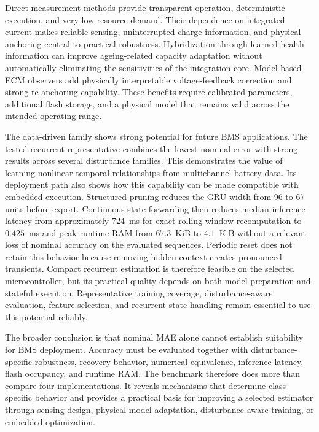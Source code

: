 Direct-measurement methods provide transparent operation, deterministic execution, and very low resource demand. Their dependence on integrated current makes reliable sensing, uninterrupted charge information, and physical anchoring central to practical robustness. Hybridization through learned health information can improve ageing-related capacity adaptation without automatically eliminating the sensitivities of the integration core. Model-based ECM observers add physically interpretable voltage-feedback correction and strong re-anchoring capability. These benefits require calibrated parameters, additional flash storage, and a physical model that remains valid across the intended operating range.

The data-driven family shows strong potential for future BMS applications. The tested recurrent representative combines the lowest nominal error with strong results across several disturbance families. This demonstrates the value of learning nonlinear temporal relationships from multichannel battery data. Its deployment path also shows how this capability can be made compatible with embedded execution. Structured pruning reduces the GRU width from 96 to 67 units before export. Continuous-state forwarding then reduces median inference latency from approximately $724$~ms for exact rolling-window recomputation to $0.425$~ms and peak runtime RAM from $67.3$~KiB to $4.1$~KiB without a relevant loss of nominal accuracy on the evaluated sequences. Periodic reset does not retain this behavior because removing hidden context creates pronounced transients. Compact recurrent estimation is therefore feasible on the selected microcontroller, but its practical quality depends on both model preparation and stateful execution. Representative training coverage, disturbance-aware evaluation, feature selection, and recurrent-state handling remain essential to use this potential reliably.

The broader conclusion is that nominal MAE alone cannot establish suitability for BMS deployment. Accuracy must be evaluated together with disturbance-specific robustness, recovery behavior, numerical equivalence, inference latency, flash occupancy, and runtime RAM. The benchmark therefore does more than compare four implementations. It reveals mechanisms that determine class-specific behavior and provides a practical basis for improving a selected estimator through sensing design, physical-model adaptation, disturbance-aware training, or embedded optimization.

